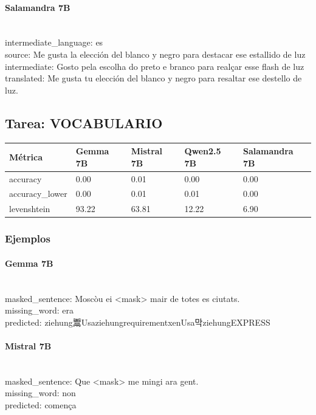\paragraph{Salamandra 7B}~\\
{intermediate\_language:} es\\
{source:} Me gusta la elección del blanco y negro para destacar ese estallido de luz\\
{intermediate:} Gosto pela escolha do preto e branco para realçar esse flash de luz\\
{translated:} Me gusta tu elección del blanco y negro para resaltar ese destello de luz.\\

\subsection{Tarea: VOCABULARIO}\label{tarea-vocabulario}
{\def\LTcaptype{none}
\begin{longtable}[]{@{}lllll@{}}
\toprule\noalign{}
Métrica & Gemma 7B & Mistral 7B & Qwen2.5 7B & Salamandra 7B \\
\midrule\noalign{}
\endhead
\bottomrule\noalign{}
\endlastfoot
accuracy & 0.00 & 0.01 & 0.00 & 0.00 \\
accuracy\_lower & 0.00 & 0.01 & 0.01 & 0.00 \\
levenshtein & 93.22 & 63.81 & 12.22 & 6.90 \\
\end{longtable}}

\subsubsection{Ejemplos}

\paragraph{Gemma 7B}~\\
{masked\_sentence:} Moscòu ei {\textless}mask{\textgreater} mair de totes es ciutats.\\
{missing\_word:} era\\
{predicted:} ziehung鬻UsaziehungrequirementxenUsa막ziehungEXPRESS\\

\paragraph{Mistral 7B}~\\
{masked\_sentence:} Que {\textless}mask{\textgreater} me mingi ara gent.\\
{missing\_word:} non\\
{predicted:} comença\\

